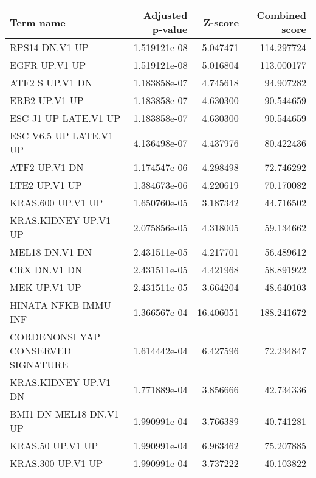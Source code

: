 \begin{tabular}{lrrr}
\toprule
                         Term name &  Adjusted p-value &   Z-score &  Combined score \\
\midrule
                    RPS14 DN.V1 UP &      1.519121e-08 &  5.047471 &      114.297724 \\
                     EGFR UP.V1 UP &      1.519121e-08 &  5.016804 &      113.000177 \\
                   ATF2 S UP.V1 DN &      1.183858e-07 &  4.745618 &       94.907282 \\
                     ERB2 UP.V1 UP &      1.183858e-07 &  4.630300 &       90.544659 \\
              ESC J1 UP LATE.V1 UP &      1.183858e-07 &  4.630300 &       90.544659 \\
            ESC V6.5 UP LATE.V1 UP &      4.136498e-07 &  4.437976 &       80.422436 \\
                     ATF2 UP.V1 DN &      1.174547e-06 &  4.298498 &       72.746292 \\
                     LTE2 UP.V1 UP &      1.384673e-06 &  4.220619 &       70.170082 \\
                 KRAS.600 UP.V1 UP &      1.650760e-05 &  3.187342 &       44.716502 \\
              KRAS.KIDNEY UP.V1 UP &      2.075856e-05 &  4.318005 &       59.134662 \\
                    MEL18 DN.V1 DN &      2.431511e-05 &  4.217701 &       56.489612 \\
                      CRX DN.V1 DN &      2.431511e-05 &  4.421968 &       58.891922 \\
                      MEK UP.V1 UP &      2.431511e-05 &  3.664204 &       48.640103 \\
              HINATA NFKB IMMU INF &      1.366567e-04 & 16.406051 &      188.241672 \\
CORDENONSI YAP CONSERVED SIGNATURE &      1.614442e-04 &  6.427596 &       72.234847 \\
              KRAS.KIDNEY UP.V1 DN &      1.771889e-04 &  3.856666 &       42.734336 \\
            BMI1 DN MEL18 DN.V1 UP &      1.990991e-04 &  3.766389 &       40.741281 \\
                  KRAS.50 UP.V1 UP &      1.990991e-04 &  6.963462 &       75.207885 \\
                 KRAS.300 UP.V1 UP &      1.990991e-04 &  3.737222 &       40.103822 \\

\end{tabular}
